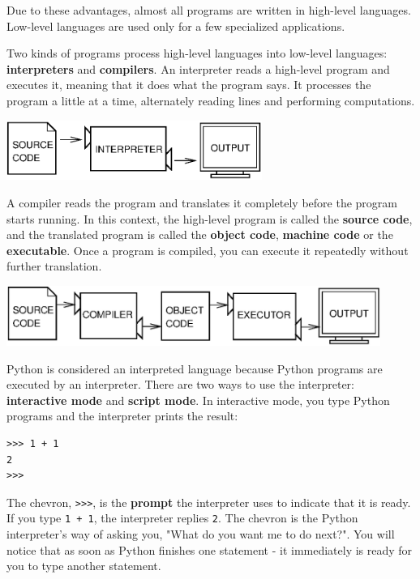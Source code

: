 \documentclass[10pt]{book}
\begin{document}
Due to these advantages, almost all programs are written in high-level
languages.  Low-level languages are used only for a few specialized
applications.


Two kinds of programs process high-level languages
into low-level languages: {\bf interpreters} and {\bf compilers}.
An interpreter reads a high-level program and executes it, meaning that it
does what the program says.  It processes the program a little at a time,
alternately reading lines and performing computations.

\beforefig
\centerline{\includegraphics[height=0.77in]{figs/interpret.eps}}
\afterfig


A compiler reads the program and translates it completely before the
program starts running.  In this context, the high-level program is
called the {\bf source code}, and the translated program is called the
{\bf object code}, {\bf machine code} or the {\bf executable}.  
Once a program is compiled, you can execute it 
repeatedly without further translation.

\beforefig
\centerline{\includegraphics[height=0.77in]{figs/compile.eps}}
\afterfig

Python is considered an interpreted language because Python programs
are executed by an interpreter.  There are two ways to use the
interpreter: {\bf interactive mode} and {\bf script mode}. In
interactive mode, you type Python programs and the interpreter prints
the result:


\beforeverb
\begin{verbatim}
>>> 1 + 1
2
>>>
\end{verbatim}
\afterverb
%
The chevron, {\tt >>>}, is the
{\bf prompt} the interpreter uses to indicate that it is ready.  If
you type {\tt 1 + 1}, the interpreter replies {\tt 2}.
The chevron is the Python interpreter's way of asking you, "What
do you want me to do next?".  You will notice that as soon as 
Python finishes one statement - it immediately is ready for you to type 
another statement.
\end{document}

